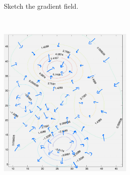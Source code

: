 Sketch the gradient field.

\begin{solution}\
\begin{center}
    \includegraphics[width=0.5\textwidth]{img/e3p1.png}
\end{center}
\end{solution}